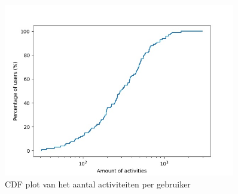 \begin{figure}[h]
    \centering
    \includegraphics[width=0.9\textwidth]{fig/Afwijkingen&Analyses/CDF_amountActivities.jpg}
    \caption{\ac{CDF} plot van het aantal activiteiten per gebruiker}\label{fig:cdf_amount_activities}
\end{figure}

